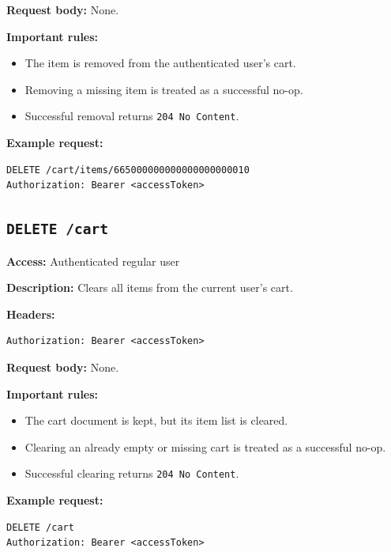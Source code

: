 \textbf{Request body:} None.

\textbf{Important rules:}

\begin{itemize}
    \item The item is removed from the authenticated user's cart.
    \item Removing a missing item is treated as a successful no-op.
    \item Successful removal returns \texttt{204 No Content}.
\end{itemize}

\textbf{Example request:}

\begin{verbatim}
DELETE /cart/items/665000000000000000000010
Authorization: Bearer <accessToken>
\end{verbatim}

\subsection{\texttt{DELETE /cart}}

\textbf{Access:} Authenticated regular user

\textbf{Description:} Clears all items from the current user's cart.

\textbf{Headers:}

\begin{verbatim}
Authorization: Bearer <accessToken>
\end{verbatim}

\textbf{Request body:} None.

\textbf{Important rules:}

\begin{itemize}
    \item The cart document is kept, but its item list is cleared.
    \item Clearing an already empty or missing cart is treated as a successful no-op.
    \item Successful clearing returns \texttt{204 No Content}.
\end{itemize}

\textbf{Example request:}

\begin{verbatim}
DELETE /cart
Authorization: Bearer <accessToken>
\end{verbatim}
